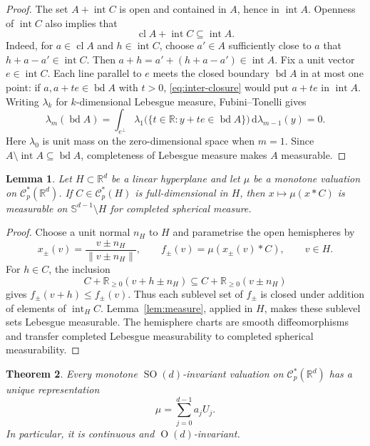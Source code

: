 \documentclass[11pt]{article}
\newcommand{\R}{\mathbb{R}}
\newcommand{\CC}{\mathcal{C}}
\newcommand{\sphere}[1]{\mathbb{S}^{#1}}
\newcommand{\SOn}[1]{\operatorname{SO}(#1)}
\newcommand{\On}[1]{\operatorname{O}(#1)}
\newcommand{\inter}{\operatorname{int}}
\newcommand{\cl}{\operatorname{cl}}
\newcommand{\bd}{\operatorname{bd}}
\theoremstyle{plain}
\newtheorem{theorem}{Theorem}[section]
\newtheorem{lemma}[theorem]{Lemma}
\theoremstyle{definition}
\begin{document}
\begin{proof}
The set $A+\inter C$ is open and contained in $A$, hence in $\inter A$.
Openness of $\inter C$ also implies that
\begin{equation}\label{eq:inter-closure}
  \cl A+\inter C\subseteq\inter A.
\end{equation}
Indeed, for $a\in\cl A$ and $h\in\inter C$, choose $a'\in A$
sufficiently close to $a$ that $h+a-a'\in\inter C$.
Then $a+h=a'+(h+a-a')\in\inter A$.
Fix a unit vector $e\in\inter C$.  Each line parallel to $e$ meets
the closed boundary $\bd A$ in at most one point: if $a,a+te\in\bd A$
with $t>0$, \eqref{eq:inter-closure} would put $a+te$ in $\inter A$.
Writing $\lambda_k$ for $k$-dimensional Lebesgue measure,
Fubini--Tonelli gives
\[
  \lambda_m(\bd A)
  =\int_{e^\perp}
     \lambda_1\bigl(\{t\in\R:y+te\in\bd A\}\bigr)
       \,\mathrm{d}\lambda_{m-1}(y)=0.
\]
Here $\lambda_0$ is unit mass on the zero-dimensional space when $m=1$.
Since $A\setminus\inter A\subseteq\bd A$, completeness of Lebesgue
measure makes $A$ measurable.
\end{proof}

\begin{lemma}\label{lem:measurable-coning}
Let $H\subset\R^d$ be a linear hyperplane and let $\mu$ be a monotone
valuation on $\CC_p^*(\R^d)$.
If $C\in\CC_p^*(H)$ is full-dimensional in $H$, then
$x\mapsto\mu(x*C)$ is measurable on $\sphere{d-1}\setminus H$
for completed spherical measure.
\end{lemma}

\begin{proof}
Choose a unit normal $n_H$ to $H$ and parametrise the open hemispheres by
\[
  x_\pm(v)=\frac{v\pm n_H}{\|v\pm n_H\|},\qquad
  f_\pm(v)=\mu(x_\pm(v)*C),\qquad v\in H.
\]
For $h\in C$, the inclusion
\[
  C+\R_{\ge0}(v+h\pm n_H)\subseteq C+\R_{\ge0}(v\pm n_H)
\]
gives $f_\pm(v+h)\le f_\pm(v)$.
Thus each sublevel set of $f_\pm$ is closed under addition of elements of
$\inter_H C$.  Lemma~\ref{lem:measure}, applied in $H$, makes these
sublevel sets Lebesgue measurable.  The hemisphere charts are smooth
diffeomorphisms and transfer completed Lebesgue measurability to
completed spherical measurability.
\end{proof}

\begin{theorem}\label{thm:regularity}
Every monotone $\SOn d$-invariant valuation on $\CC_p^*(\R^d)$
has a unique representation
\begin{equation}\label{eq:pointed-representation}
  \mu=\sum_{j=0}^{d-1}a_jU_j.
\end{equation}
In particular, it is continuous and $\On d$-invariant.
\end{theorem}
\end{document}
